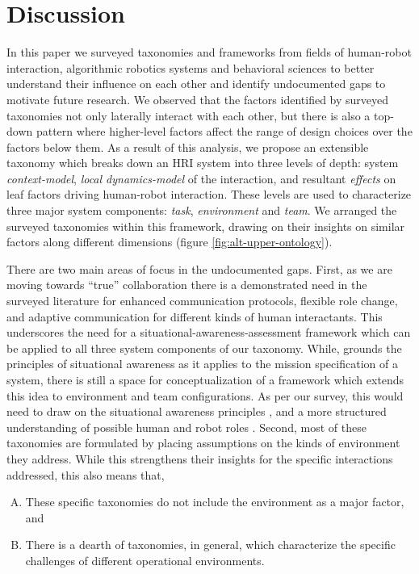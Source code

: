 \documentclass[letterpaper, 10 pt, conference]{ieeeconf}  %
\theoremstyle{definition}
\begin{document}
\section{Discussion}
\label{sec:discussion}

In this paper we surveyed taxonomies and frameworks from fields of human-robot interaction, algorithmic robotics systems and behavioral sciences to better understand their influence on each other and identify undocumented gaps to motivate future research.
We observed that the factors identified by surveyed taxonomies not only laterally interact with each other, but there is also a top-down pattern where higher-level factors affect the range of design choices over the factors below them.
As a result of this analysis, we propose an extensible taxonomy which breaks down an HRI system into three levels of depth: system \textit{context-model}, \textit{local dynamics-model} of the interaction, and resultant \textit{effects} on leaf factors driving human-robot interaction.
These levels are used to characterize three major system components: \textit{task}, \textit{environment} and \textit{team}.
We arranged the surveyed taxonomies within this framework, drawing on their insights on similar factors along different dimensions (figure \ref{fig:alt-upper-ontology}).

There are two main areas of focus in the undocumented gaps.
First, as we are moving towards ``true'' collaboration there is a demonstrated need in the surveyed literature for enhanced communication protocols, flexible role change, and adaptive communication for different kinds of human interactants.
This underscores the need for a situational-awareness-assessment framework which can be applied to all three system components of our taxonomy.
While, \cite{chen2018situation} grounds the principles of situational awareness as it applies to the mission specification of a system, there is still a space for conceptualization of a framework which extends this idea to environment and team configurations.
As per our survey, this would need to draw on the situational awareness principles \cite{endsley1988design}, and a more structured understanding of possible human and robot roles \cite{Scholtz2003, Goodrich2007}.
Second, most of these taxonomies are formulated by placing assumptions on the kinds of environment they address.
While this strengthens their insights for the specific interactions addressed, this also means that,
\begin{enumerate}[A)]
    \item These specific taxonomies do not include the environment as a major factor, and
    \item There is a dearth of taxonomies, in general, which characterize the specific challenges of different operational environments.
\end{enumerate}
\end{document}
